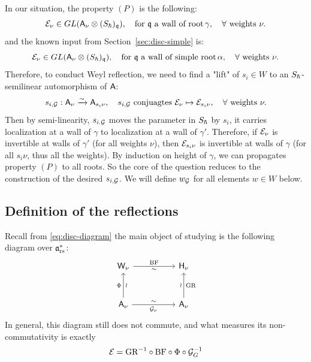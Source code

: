 \documentclass{article}
\theoremstyle{plain}
\theoremstyle{definition}
\theoremstyle{remark}
\numberwithin{equation}{section}
\begin{document}
In our situation, the property $(P)$ is the following:
\begin{equation*}
    \mathcal E_\nu \in GL(\mathsf A_\nu \otimes (S_\hbar)_\mathfrak q), \quad \text{for}\, \,\mathfrak q \, \,\text{a wall of root} \,\gamma, \quad \forall\,\,\text{weights}\,\, \nu.
\end{equation*}
and the known input from Section~\ref{sec:disc-simple} is:
\begin{equation*}
    \mathcal E_\nu \in GL(\mathsf A_\nu \otimes (S_\hbar)_\mathfrak q), \quad \text{for}\, \,\mathfrak q \, \,\text{a wall of simple root} \,\alpha, \quad \forall\,\,\text{weights}\,\, \nu.
\end{equation*}
Therefore, to conduct Weyl reflection, we need to find a "lift" of $s_i \in W$ to an $S_\hbar$-semilinear automorphism of $\mathsf A$:
\begin{equation*}
    s_{i,\mathcal G}: \mathsf A_\nu \xrightarrow{\sim} \mathsf A_{s_i\nu}, \quad s_{i,\mathcal G} \,\, \text{conjuagtes}\, \, \mathcal E_\nu \mapsto \mathcal E_{s_i\nu}, \quad \forall\,\,\text{weights}\,\, \nu.
\end{equation*}
Then by semi-linearity, $s_{i.\mathcal G}$ moves the parameter in $S_\hbar$ by $s_i$, it carries localization at a wall of $\gamma$ to localization at a wall of $\gamma'$. Therefore, if $\mathcal E_\nu$ is invertible at walls of $\gamma'$ (for all weights $\nu$), then $\mathcal E_{s_i\nu}$ is invertible at walls of $\gamma$ (for all $s_i\nu$, thus all the weights). By induction on height of $\gamma$, we can propagates property $(P)$ to all roots. So the core of the question reduces to the construction of the desired $s_{i,\mathcal G}$. We will define $w_{\mathcal G}$ for all elements $w \in W$ below.

\subsection*{Definition of the reflections}
Recall from \eqref{eq:disc-diagram} the main object of studying is the following diagram over $\mathfrak{a}^*_{\mathrm{rs}}$:
\begin{equation}\label{eq:commu-diagram}
\begin{tikzcd}[column sep=5em,row sep=3em]
\sfW_\nu\arrow[r,"\BF","\sim"']
& \sfH_\nu
\\
\sfA_\nu\arrow[u,"\wr"',"\Phi"]\arrow[r,"\calG_\nu"',"\sim"]
& \sfA_\nu\arrow[u,"\GR"',"\wr"]
\end{tikzcd}
\end{equation}
In general, this diagram still does not commute, and what measures its non-commutativity is exactly
\begin{equation*}
    \mathcal E = \mathrm{GR}^{-1}\circ \mathrm{BF} \circ \Phi \circ \mathcal G_G^{-1}
\end{equation*}
\end{document}
